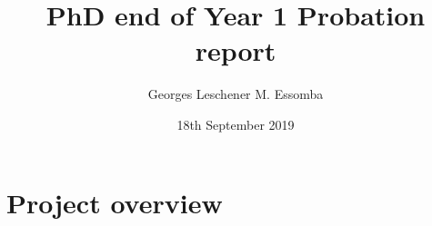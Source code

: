 \documentclass{article}
\begin{document}
\author{Georges Leschener M. Essomba}
\title{PhD end of Year 1 Probation report}
\date{18th September 2019} %

\maketitle{} %

\pagebreak %
\tableofcontents %
\pagebreak %




\section{Project overview}
\end{document}
